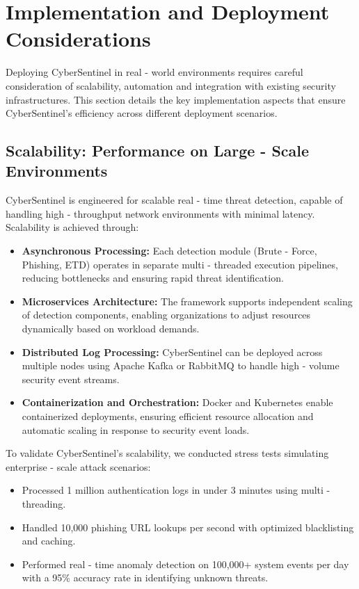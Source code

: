 \documentclass{article}
\begin{document}
\section{Implementation and Deployment Considerations}
Deploying CyberSentinel in real - world environments requires careful consideration of scalability, automation and integration with existing security infrastructures. This section details the key implementation aspects that ensure CyberSentinel's efficiency across different deployment scenarios.

\subsection{Scalability: Performance on Large - Scale Environments}

CyberSentinel is engineered for scalable real - time threat detection, capable of handling high - throughput network environments with minimal latency. Scalability is achieved through:

\begin{itemize}
    \item \textbf{Asynchronous Processing:} Each detection module (Brute - Force, Phishing, ETD) operates in separate multi - threaded execution pipelines, reducing bottlenecks and ensuring rapid threat identification.
    \item \textbf{Microservices Architecture:} The framework supports independent scaling of detection components, enabling organizations to adjust resources dynamically based on workload demands.
    \item \textbf{Distributed Log Processing:} CyberSentinel can be deployed across multiple nodes using Apache Kafka or RabbitMQ to handle high - volume security event streams.
    \item \textbf{Containerization and Orchestration:} Docker and Kubernetes enable containerized deployments, ensuring efficient resource allocation and automatic scaling in response to security event loads.
\end{itemize}

To validate CyberSentinel’s scalability, we conducted stress tests simulating enterprise - scale attack scenarios:

\begin{itemize}
    \item Processed 1 million authentication logs in under 3 minutes using multi - threading.
    \item Handled 10,000 phishing URL lookups per second with optimized blacklisting and caching.
    \item Performed real - time anomaly detection on 100,000+ system events per day with a 95\% accuracy rate in identifying unknown threats.
\end{itemize}
\end{document}
